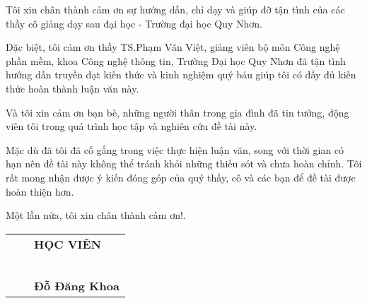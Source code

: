 
Tôi xin chân thành cảm ơn sự hướng dẫn, chỉ dạy và giúp đỡ tận tình của các thầy cô giảng dạy sau đại học - Trường đại học Quy Nhơn.

Đặc biệt, tôi cảm ơn thầy TS.Phạm Văn Việt, giảng viên bộ môn Công nghệ phần mềm, khoa Công nghệ thông tin, Trường Đại học Quy Nhơn đã tận tình hướng dẫn truyền đạt kiến thức và kinh nghiệm quý báu giúp tôi có đầy đủ kiến thức hoàn thành luận văn này.

Và tôi xin cảm ơn bạn bè, những người thân trong gia đình đã tin tưởng, động viên tôi trong quá trình học tập và nghiên cứu đề tài này.

Mặc dù đã tôi đã cố gắng trong việc thực hiện luận văn, song với thời gian có hạn nên đề tài này không thể tránh khỏi những thiếu sót và chưa hoàn chỉnh. Tôi rất mong nhận được ý kiến đóng góp của quý thầy, cô và các bạn để đề tài được hoàn thiện hơn.

Một lần nữa, tôi xin chân thành cảm ơn!.\\


\begin{tabu} to 1.0 \textwidth {  X[c] X[c]  X[c]   }

	 & &  \textbf{HỌC VIÊN} \\
	 \\ \\ \\ \\ \\ 
	 & &  \textbf{Đỗ Đăng Khoa}  \\
         
       \end{tabu}


